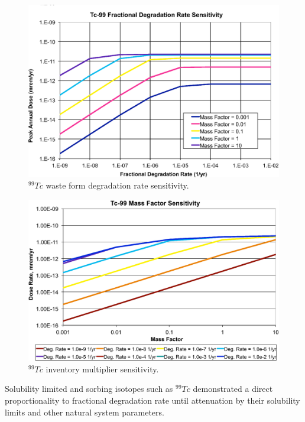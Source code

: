 \begin{figure}[ht!]
  \centering
  \includegraphics[width=\linewidth]{Tc99_deg_rate.eps}
  \caption{$^{99}Tc$ waste form degradation rate sensitivity.}
  \label{fig:WFDegTc99}
\end{figure}

\begin{figure}[ht!]
  \centering
  \includegraphics[width=\linewidth]{Tc99_mass_factor.eps}
  \caption{$^{99}Tc$ inventory multiplier sensitivity.}
  \label{fig:WFDegTc99MF}
\end{figure}

Solubility limited and sorbing isotopes such as $^{99}Tc$ demonstrated a direct 
proportionality to fractional degradation rate until attenuation by their 
solubility limits and other natural system parameters. 

